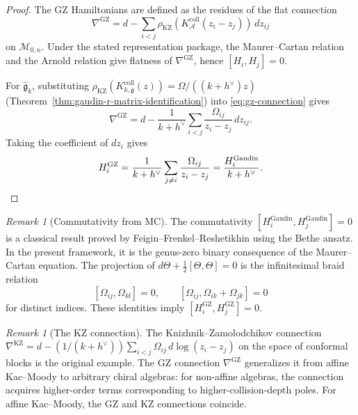\documentclass[11pt]{article}
\theoremstyle{plain}
\theoremstyle{definition}
\theoremstyle{remark}
\newtheorem{remark}[theorem]{Remark}
\newcommand{\fg}{\mathfrak{g}}
\newcommand{\cA}{\mathcal{A}}
\numberwithin{equation}{section}
\begin{document}
\begin{proof}
The GZ Hamiltonians are defined as the residues of the flat connection
\begin{equation}\label{eq:gz-connection}
 \nabla^{\mathrm{GZ}} = d - \sum_{i < j}
 \rho_{\mathrm{KZ}}(K_\cA^{\mathrm{coll}}(z_i-z_j)) \,
 dz_{ij}
\end{equation}
on $\mathcal{M}_{0,n}$.  Under the stated representation package,
the Maurer--Cartan relation and the Arnold relation give flatness of
$\nabla^{\mathrm{GZ}}$, hence $[H_i,H_j]=0$.

For $\widehat{\fg}_k$, substituting
$\rho_{\mathrm{KZ}}(K_{k,\fg}^{\mathrm{coll}}(z))
=\Omega/((k+h^\vee)z)$
(Theorem~\ref{thm:gaudin-r-matrix-identification})
into \eqref{eq:gz-connection} gives
\[
 \nabla^{\mathrm{GZ}}
 = d - \frac{1}{k+h^\vee}
 \sum_{i < j} \frac{\Omega_{ij}}{z_i - z_j} \, dz_{ij}.
\]
Taking the coefficient of \(dz_i\) gives
\[
 H_i^{\mathrm{GZ}}
 = \frac{1}{k+h^\vee}
 \sum_{j \neq i} \frac{\Omega_{ij}}{z_i - z_j}
 = \frac{H_i^{\mathrm{Gaudin}}}{k + h^\vee}. \qedhere
\]
\end{proof}

\begin{remark}[Commutativity from MC]\label{rem:commutativity}
The commutativity $[H_i^{\mathrm{Gaudin}}, H_j^{\mathrm{Gaudin}}] =
0$ is a classical result proved by Feigin--Frenkel--Reshetikhin
\cite{FFR1994} using the Bethe ansatz. In the present framework, it
is the genus-zero binary consequence of the Maurer--Cartan equation.
The projection of \(d\Theta+\frac12[\Theta,\Theta]=0\) is the
infinitesimal braid relation
\[
 [\Omega_{ij},\Omega_{kl}]=0,\qquad
 [\Omega_{ij},\Omega_{ik}+\Omega_{jk}]=0
\]
for distinct indices. These identities imply
\([H_i^{\mathrm{GZ}},H_j^{\mathrm{GZ}}]=0\).
\end{remark}

\begin{remark}[The KZ connection]\label{rem:kz-connection}
The Knizhnik--Zamolodchikov connection
$\nabla^{\mathrm{KZ}} = d - (1/(k+h^\vee)) \sum_{i<j}
\Omega_{ij} \, d\log(z_i - z_j)$
on the space of conformal blocks is the original example. The GZ
connection $\nabla^{\mathrm{GZ}}$ generalizes it from affine
Kac--Moody to arbitrary chiral algebras: for non-affine algebras,
the connection acquires higher-order terms corresponding to
higher-collision-depth poles. For affine Kac--Moody, the GZ and KZ
connections coincide.
\end{remark}

\end{document}
